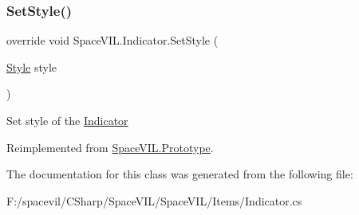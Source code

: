 \mbox{\label{class_space_v_i_l_1_1_indicator_aa9233e9dda656a3634bcc3ace59c00dc}} 
\subsubsection{\texorpdfstring{Set\+Style()}{SetStyle()}}
{\footnotesize\ttfamily override void Space\+V\+I\+L.\+Indicator.\+Set\+Style (\begin{DoxyParamCaption}\item[{\mbox{\hyperlink{class_space_v_i_l_1_1_decorations_1_1_style}{Style}}}]{style }\end{DoxyParamCaption})\hspace{0.3cm}{\ttfamily [virtual]}}



Set style of the \mbox{\hyperlink{class_space_v_i_l_1_1_indicator}{Indicator}} 



Reimplemented from \mbox{\hyperlink{class_space_v_i_l_1_1_prototype_ae96644a6ace490afb376fb542161e541}{Space\+V\+I\+L.\+Prototype}}.



The documentation for this class was generated from the following file\+:\begin{DoxyCompactItemize}
\item 
F\+:/spacevil/\+C\+Sharp/\+Space\+V\+I\+L/\+Space\+V\+I\+L/\+Items/Indicator.\+cs\end{DoxyCompactItemize}
